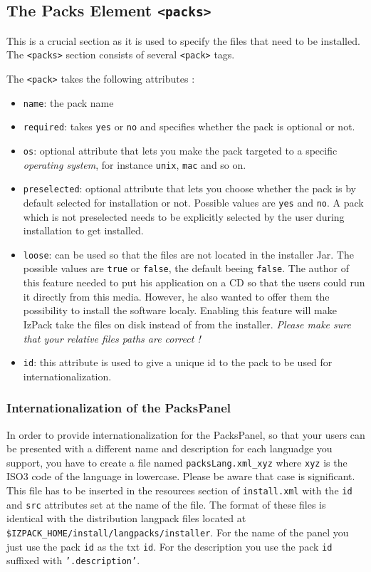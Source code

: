 \subsection{The Packs Element \texttt{<packs>}}
\label{packs-element}

This is a crucial section as it is used to specify the files that need
to be installed. The \texttt{<packs>} section consists of several 
\texttt{<pack>} tags.

The \texttt{<pack>} takes the following attributes :
  \begin{itemize}
    \item \texttt{name}: the pack name
    \item \texttt{required}: takes \texttt{yes} or \texttt{no} and specifies
    whether the pack is optional or not.
    \item \texttt{os}: optional attribute that lets you make the pack targeted
    to a specific \textsl{operating system}, for instance \texttt{unix},
    \texttt{mac} and so on.
    \item \texttt{preselected}: optional attribute that lets you choose whether
    the pack is by default selected for installation or not. Possible values
    are \texttt{yes} and \texttt{no}. A pack which is not preselected needs to
    be explicitly selected by the user during installation to get installed.
    \item \texttt{loose}: can be used so that the files are not located in the
    installer Jar. The possible values are \texttt{true} or \texttt{false}, the
    default beeing \texttt{false}. The author of this feature needed to put his
    application on a CD so that the users could run it directly from this media.
    However, he also wanted to offer them the possibility to install the
    software localy. Enabling this feature will make IzPack take the files on
    disk instead of from the installer. \textit{Please make sure that your relative
    files paths are correct !}
    \item \texttt{id}: this attribute is used to give a unique id to the pack to
    be used for internationalization.
  \end{itemize}

\subsubsection{Internationalization of the PacksPanel}
In order to provide internationalization for the PacksPanel, so that your users can
be presented with a different name and description for each languadge you support,
 you have to create a file named \texttt{packsLang.xml\_xyz} where \texttt{xyz}
 is the ISO3 code of the language in lowercase. Please be aware that case is significant.
 This file has to be inserted in the resources section of \texttt{install.xml} with the
 \texttt{id} and \texttt{src} attributes set at the name of the file. The format of
 these files is identical with the distribution langpack files located at
 \texttt{\$IZPACK\_HOME/install/langpacks/installer}. For the name of the panel you just
 use the pack \texttt{id} as the txt \texttt{id}. For the description you use the pack
 \texttt{id} suffixed with \texttt{'.description'}.

